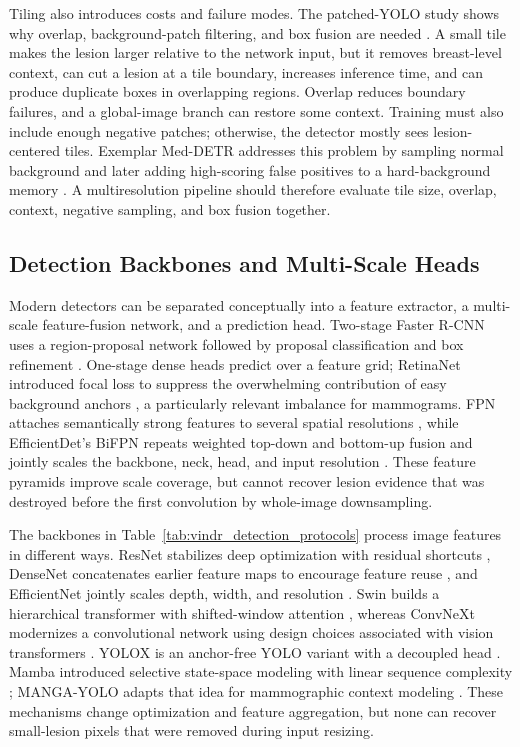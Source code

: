 Tiling also introduces costs and failure modes. The patched-YOLO study shows
why overlap, background-patch filtering, and box fusion are needed
\cite{bulatovic2025patched}. A small tile makes the lesion larger relative to
the network input, but it removes breast-level context, can cut a lesion at a
tile boundary, increases inference time, and can produce duplicate boxes in
overlapping regions. Overlap reduces boundary failures, and a global-image
branch can restore some context. Training must also include enough negative
patches; otherwise, the detector mostly sees lesion-centered tiles. Exemplar
Med-DETR addresses this problem by sampling normal background and later adding
high-scoring false positives to a hard-background memory
\cite{bhat2025exemplar}. A multiresolution pipeline should therefore evaluate
tile size, overlap, context, negative sampling, and box fusion together.

\subsection{Detection Backbones and Multi-Scale Heads}
\label{sec:background_detectors}

Modern detectors can be separated conceptually into a feature extractor, a
multi-scale feature-fusion network, and a prediction head.  Two-stage Faster
R-CNN uses a region-proposal network followed by proposal classification and
box refinement \cite{ren2017fasterrcnn}.  One-stage dense heads predict over a
feature grid; RetinaNet introduced focal loss to suppress the overwhelming
contribution of easy background anchors \cite{lin2017retinanet}, a particularly
relevant imbalance for mammograms.  FPN attaches semantically strong features
to several spatial resolutions \cite{lin2017fpn}, while EfficientDet's BiFPN
repeats weighted top-down and bottom-up fusion and jointly scales the backbone,
neck, head, and input resolution \cite{tan2020efficientdet}.  These feature
pyramids improve scale coverage, but cannot recover lesion evidence that was
destroyed before the first convolution by whole-image downsampling.

The backbones in Table~\ref{tab:vindr_detection_protocols} process image
features in different ways. ResNet stabilizes deep optimization with residual shortcuts
\cite{he2016resnet}, DenseNet concatenates earlier feature maps to encourage
feature reuse \cite{huang2017densenet}, and EfficientNet jointly scales depth,
width, and resolution \cite{tan2019efficientnet}. Swin builds a hierarchical
transformer with shifted-window attention \cite{liu2021swin}, whereas ConvNeXt
modernizes a convolutional network using design choices associated with vision
transformers \cite{liu2022convnext}. YOLOX is an anchor-free YOLO variant with a
decoupled head \cite{ge2021yolox}. Mamba introduced selective state-space
modeling with linear sequence complexity \cite{gu2024mamba}; MANGA-YOLO adapts
that idea for mammographic context modeling \cite{trang2025manga}. These
mechanisms change optimization and feature aggregation, but none can recover
small-lesion pixels that were removed during input resizing.

